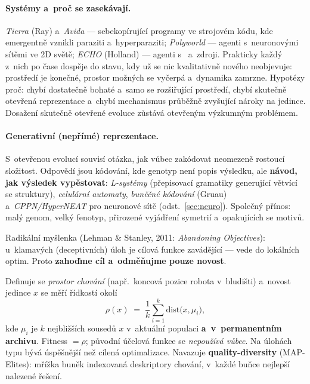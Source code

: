 \documentclass[11pt,a4paper]{article}
\theoremstyle{definition}
\begin{document}
\paragraph{Systémy a~proč se zasekávají.} \emph{Tierra} (Ray) a~\emph{Avida} ---
sebekopírující programy ve strojovém kódu, kde emergentně vznikli paraziti
a~hyperparaziti; \emph{Polyworld} --- agenti s~neuronovými sítěmi ve 2D světě;
\emph{ECHO} (Holland) --- agenti s~ a~zdroji. Prakticky každý z~nich po čase
dospěje do stavu, kdy už se nic kvalitativně nového neobjevuje: prostředí je konečné,
prostor možných  se vyčerpá a~dynamika zamrzne. Hypotézy proč: chybí
dostatečně bohaté a~samo se rozšiřující prostředí, chybí skutečně otevřená reprezentace
a~chybí mechanismus průběžně zvyšující nároky na jedince. Dosažení skutečně otevřené
evoluce zůstává otevřeným výzkumným problémem.

\paragraph{Generativní (nepřímé) reprezentace.} S~otevřenou evolucí souvisí otázka, jak
vůbec zakódovat neomezeně rostoucí složitost. Odpovědí jsou kódování, kde genotyp není
popis výsledku, ale \textbf{návod, jak výsledek vypěstovat}: \emph{L-systémy}
(přepisovací gramatiky generující větvící se struktury), \emph{celulární automaty},
\emph{buněčné kódování} (Gruau) a~\emph{CPPN/HyperNEAT} pro neuronové sítě
(odst.~\ref{sec:neuro}). Společný přínos: malý genom, velký fenotyp, přirozené vyjádření
symetrií a~opakujících se motivů.

\begin{defbox}
Radikální myšlenka (Lehman \& Stanley, 2011: \emph{Abandoning Objectives}): u~klamavých
(deceptivních) úloh je cílová funkce zavádějící --- vede do lokálních optim. Proto
\textbf{zahoďme cíl a~odměňujme pouze novost}.

Definuje se \emph{prostor chování} (např.\ koncová pozice robota v~bludišti) a~novost
jedince $x$ se měří řídkostí okolí
\[
\rho(x) \;=\; \frac{1}{k}\sum_{i=1}^{k} \mathrm{dist}\big(x, \mu_i\big),
\]
kde $\mu_i$ je $k$ nejbližších sousedů $x$ v~aktuální populaci \textbf{a~v~permanentním
archivu}. Fitness $=\rho$; původní účelová funkce se \emph{nepoužívá vůbec}. Na úlohách
typu  bývá úspěšnější než cílená optimalizace. Navazuje
\textbf{quality-diversity} (MAP-Elites): mřížka buněk indexovaná deskriptory chování,
v~každé buňce nejlepší nalezené řešení.
\end{defbox}
\end{document}
